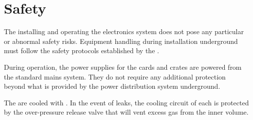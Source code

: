 \section{Safety}
\label{sec:dp-tpcelec-safety}
The installing and operating the electronics system does not pose any particular or abnormal safety risks. %
Equipment handling during installation underground must %
follow the safety protocols established by the . 

During operation, the  power supplies for the  cards and  crates are powered from the standard mains system. They do not require any additional protection beyond what is %
provided by the power distribution system underground. 

The  are cooled with . In the event of leaks, the cooling circuit of each  is protected by the over-pressure release valve that will vent excess gas from the inner volume.  
